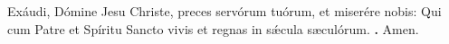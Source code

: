  \hspace{.3em}
Exáudi, Dómine Jesu Christe, preces servórum tuórum, et miserére nobis: Qui cum Patre et Spíritu Sancto vivis et regnas in s\'{\ae}cula sæculórum. 
\textbf{\Rbar.} Amen.




